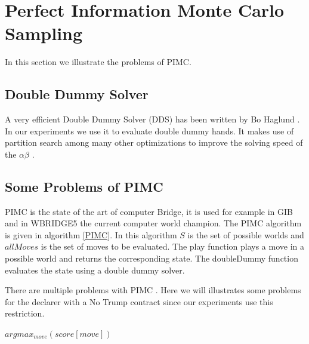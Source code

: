 \documentclass{ecai}
\begin{document}
\section{Perfect Information Monte Carlo Sampling}

In this section we illustrate the problems of PIMC.

\subsection{Double Dummy Solver}

A very efficient Double Dummy Solver (DDS) has been written by Bo
Haglund \cite{haglund2010search}. In our experiments we use it to
evaluate double dummy hands. It makes use of partition
search \cite{ginsberg96} among many other optimizations to improve the
solving speed of the $\alpha\beta$ .

\subsection{Some Problems of PIMC}

PIMC is the state of the art of computer Bridge, it is used for
example in GIB \cite{ginsberg2001} and in
WBRIDGE5 \cite{ventos2017boosting} the current computer world
champion. The PIMC algorithm is given in algorithm \ref{PIMC}. In this
algorithm $S$ is the set of possible worlds and $allMoves$ is the set
of moves to be evaluated. The play function plays a move in a possible
world and returns the corresponding state. The doubleDummy function
evaluates the state using a double dummy solver.

There are multiple problems with
PIMC \cite{long2010understanding}. Here we will illustrates some
problems for the declarer with a No Trump contract since our
experiments use this restriction.

\begin{algorithm}
\begin{algorithmic}[1]
\begin{ALC@g}
\ENDFOR
\ENDFOR
\RETURN $argmax_{move}(score [move])$
\end{ALC@g}
\end{algorithmic}
\caption{\label{PIMC}The PIMC algorithm.}
\end{algorithm}
\end{document}
